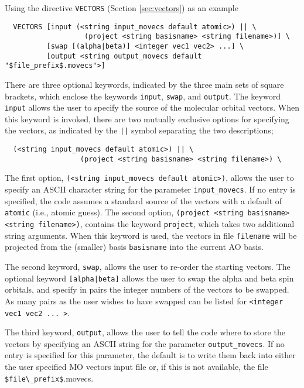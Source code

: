 Using the directive \verb+VECTORS+ (Section \ref{sec:vectors}) as an
example
\begin{verbatim}
  VECTORS [input (<string input_movecs default atomic>) || \
                   (project <string basisname> <string filename>)] \
          [swap [(alpha|beta)] <integer vec1 vec2> ...] \
          [output <string output_movecs default "$file_prefix$.movecs">]
\end{verbatim}

There are three optional keywords, indicated by the three main sets
of square brackets, which enclose the keywords \verb+input+,
\verb+swap+, and \verb+output+.  The keyword \verb+input+ allows the
user to specify the source of the molecular orbital vectors.  When
this keyword is invoked, there are two mutually exclusive options for
specifying the vectors, as indicated by the \verb+||+ symbol
separating the two descriptions;

\begin{verbatim}
  (<string input_movecs default atomic>) || \
                  (project <string basisname> <string filename>) \
\end{verbatim}

The first option, \verb+(<string input_movecs default atomic>)+,
allows the user to specify an ASCII character string for the parameter
{\tt input\_movecs}.  If no entry is specified, the code assumes a
standard source of the vectors with a default of \verb+atomic+ (i.e.,
atomic guess).  The second option, {\tt(project <string basisname>
  <string filename>)}, contains the keyword \verb+project+, which
takes two additional string arguments.  When this keyword is used, the
vectors in file \verb+filename+ will be projected from the (smaller)
basis \verb+basisname+ into the current AO basis.

The second keyword, \verb+swap+, allows the user to re-order the
starting vectors.  The optional keyword \verb+[alpha|beta]+ allows the
user to swap the alpha and beta spin orbitals, and specify in pairs
the integer numbers of the vectors to be swapped.  As many pairs as
the user wishes to have swapped can be listed for {\tt <integer vec1
vec2 ... >}.

The third keyword, \verb+output+, allows the user to tell the code
where to store the vectors by specifying an ASCII string for the
parameter {\tt output\_movecs}.  If no entry is specified for this
parameter, the default is to write them back into either the user
specified MO vectors input file or, if this is not available, the file
\verb+$file\_prefix$+.movecs.

